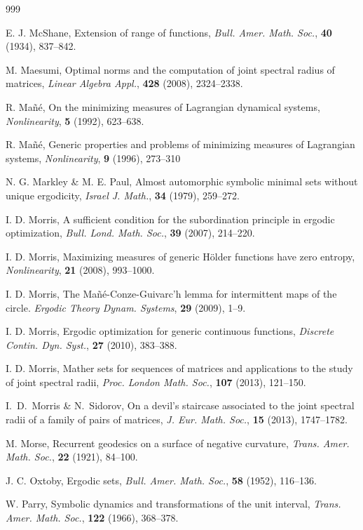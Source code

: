 \documentclass[reqno,11pt]{amsart}
\theoremstyle{definition}
\theoremstyle{remark}
\theoremstyle{remark}
\numberwithin{equation}{section}
\begin{document}
\begin{thebibliography}{999}
	
 E. J. McShane,
Extension of range of functions,
{\it Bull. Amer. Math. Soc.}, {\bf 40} (1934), 837--842.

 M. Maesumi, Optimal norms and the computation of joint spectral radius
 of matrices, {\it  Linear Algebra Appl.}, {\bf 428}  (2008), 2324--2338.

R. Mañé, On the minimizing measures of Lagrangian dynamical systems, 
{\it Nonlinearity}, {\bf 5} (1992), 623–638. 

R. Mañé, Generic properties and problems of minimizing measures of Lagrangian systems, {\it Nonlinearity}, 
{\bf 9} (1996), 273–310



N. G. Markley \& M. E. Paul,
Almost automorphic symbolic minimal sets without unique ergodicity,
{\it Israel J. Math.}, {\bf 34} (1979), 259--272.

	I. D. Morris, A sufficient condition for the subordination principle in ergodic optimization,
{\it Bull. Lond. Math. Soc.}, {\bf 39} (2007), 214--220.

 I. D. Morris,
Maximizing measures of generic H\"older functions have zero entropy,
{\it Nonlinearity},
{\bf 21} (2008), 993--1000.


I. D. Morris,
The Ma\~n\'e-Conze-Guivarc'h lemma for intermittent maps of the circle.
\textit{Ergodic Theory Dynam. Systems}, {\bf 29} (2009), 1--9.

 I. D. Morris,
Ergodic optimization for generic continuous functions,
{\it   Discrete Contin. Dyn. Syst.}, 
{\bf 27} (2010),
383--388.

I. D. Morris, 
Mather sets for sequences of matrices and applications to the study of joint spectral radii,
{\it Proc. London Math. Soc.}, {\bf 107} (2013), 121--150. 

I.~D.~Morris \& N.~Sidorov,
On a devil's staircase associated to the joint spectral radii of a family of pairs of matrices,
{\it J. Eur. Math. Soc.}, {\bf 15} (2013), 1747--1782. 

M. Morse,
Recurrent geodesics on a surface of negative curvature,
{\it Trans. Amer. Math. Soc.},
{\bf 22} (1921), 84--100.


J. C. Oxtoby, 
Ergodic sets,
{\it Bull. Amer. Math. Soc.}, {\bf 58} (1952), 116--136.


 W. Parry,
Symbolic dynamics and transformations of the unit interval,
{\it Trans. Amer. Math. Soc.}, {\bf 122} (1966),  368--378.


\end{thebibliography}
\end{document}
